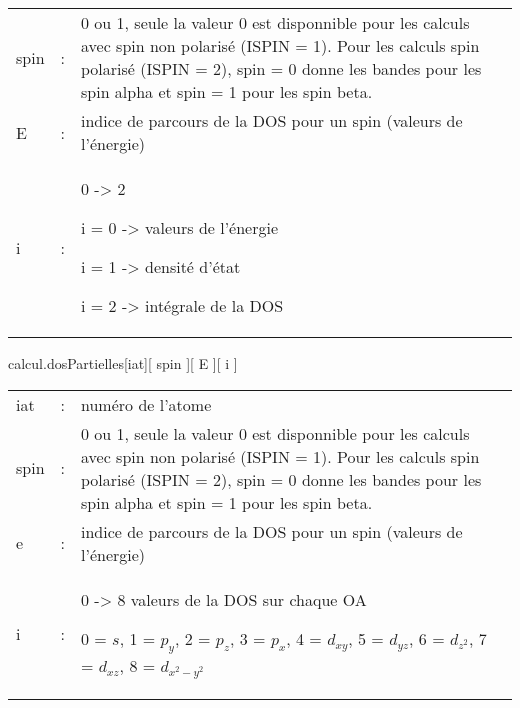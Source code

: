 \documentclass[10pt,a4paper,fleqn]{article}
\begin{document}
\begin{itemize}
\begin{tabularx}{0.95\textwidth}{lcX}
                    spin   & : & 0 ou 1, seule la valeur 0 est disponnible pour les calculs
                            avec spin non polarisé (ISPIN = 1). Pour les calculs spin
                            polarisé (ISPIN = 2), spin = 0 donne les bandes pour les
                            spin alpha et spin = 1 pour les spin beta. \\
    
                    E      & : & indice de parcours de la DOS pour un spin (valeurs de l'énergie) \\
    
                    i      & : & 0 -> 2\par
                            i = 0 -> valeurs de l'énergie\par
                            i = 1 -> densité d'état\par
                            i = 2 -> intégrale de la DOS \\
\end{tabularx}

\vspace{5mm}

\begin{console}
calcul.dosPartielles[iat][ spin ][ E ][ i ]
\end{console}
    
\begin{tabularx}{0.95\textwidth}{lcX}
		    iat    & : & numéro de l'atome \\
                    spin   & : & 0 ou 1, seule la valeur 0 est disponnible pour les calculs
                            avec spin non polarisé (ISPIN = 1). Pour les calculs spin
                            polarisé (ISPIN = 2), spin = 0 donne les bandes pour les
                            spin alpha et spin = 1 pour les spin beta. \\
    
                    e      & : & indice de parcours de la DOS pour un spin (valeurs de l'énergie) \\
    
                    i      & : & 0 -> 8 valeurs de la DOS sur chaque OA \par
		    0 = $s$, 1 = $p_y$, 2 = $p_z$, 3 = $p_x$, 4 = $d_{xy}$, 5 = $d_{yz}$, 6 = $d_{z^2}$,
		    7 = $d_{xz}$, 8 = $d_{x^2-y^2}$ \\
\end{tabularx}

\end{itemize}
\end{document}
